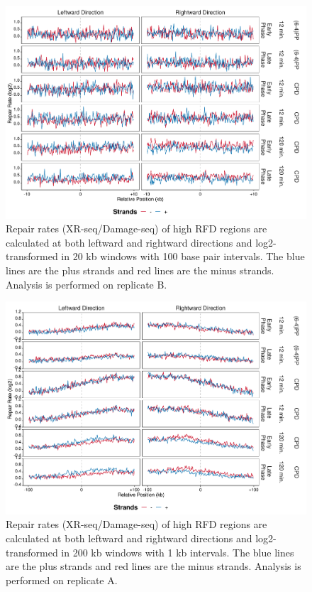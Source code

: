 \begin{figure}[H]
\begin{center}
\includegraphics[width=\textwidth]{Chapters/7_appendix/figures/supfig63}
\caption[Repair rate of high RFDs in 20 kb (replicate B).]{Repair rates (XR-seq/Damage-seq) of high RFD regions are calculated at both leftward and rightward directions and log2-transformed in 20 kb windows with 100 base pair intervals. The blue lines are the plus strands and red lines are the minus strands. Analysis is performed on replicate B.}
\label{supfig:rr20rfdB}
\end{center}
\end{figure}

\begin{figure}[H]
\begin{center}
\includegraphics[width=\textwidth]{Chapters/7_appendix/figures/supfig64}
\caption[Repair rate of high RFDs in 200 kb (replicate A).]{Repair rates (XR-seq/Damage-seq) of high RFD regions are calculated at both leftward and rightward directions and log2-transformed in 200 kb windows with 1 kb intervals. The blue lines are the plus strands and red lines are the minus strands. Analysis is performed on replicate A.}
\label{supfig:rr200rfdA}
\end{center}
\end{figure}

